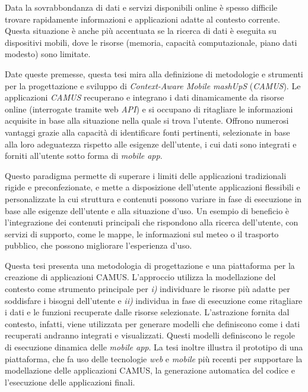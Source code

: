 Data la sovrabbondanza di dati e servizi disponibili online è spesso difficile trovare rapidamente informazioni e applicazioni adatte al contesto corrente. Questa situazione è anche più accentuata se la ricerca di dati è eseguita su dispositivi mobili, dove le risorse (memoria, capacità computazionale, piano dati modesto) sono limitate.

Date queste premesse, questa tesi mira alla definizione di metodologie e strumenti per la progettazione e sviluppo di \emph{Context-Aware Mobile mashUpS} (\emph{CAMUS}). Le applicazioni \emph{CAMUS} recuperano e integrano i dati dinamicamente da risorse online (interrogate tramite web \emph{API}) e si occupano di ritagliare le informazioni acquisite in base alla situazione nella quale si trova l'utente. Offrono numerosi vantaggi grazie alla capacità di identificare fonti pertinenti, selezionate in base alla loro adeguatezza rispetto alle esigenze dell'utente, i cui dati sono integrati e forniti all'utente sotto forma di \emph{mobile app}.

Questo paradigma permette di superare i limiti delle applicazioni tradizionali rigide e preconfezionate, e mette a disposizione dell'utente applicazioni flessibili e personalizzate la cui struttura e contenuti possono variare in fase di esecuzione in base alle esigenze dell'utente e alla situazione d'uso. Un esempio di beneficio è l'integrazione dei contenuti principali che rispondono alla ricerca dell'utente, con servizi di supporto, come le mappe, le informazioni sul meteo o il trasporto pubblico, che possono migliorare l'esperienza d'uso.

Questa tesi presenta una metodologia di progettazione e una piattaforma per la creazione di applicazioni CAMUS. L'approccio utilizza la modellazione del contesto come strumento principale per \emph{i)} individuare le risorse più adatte per soddisfare i bisogni dell'utente e \emph{ii)} individua in fase di esecuzione come ritagliare i dati e le funzioni recuperate dalle risorse selezionate. L'astrazione fornita dal contesto, infatti, viene utilizzata per generare modelli che definiscono come i dati recuperati andranno integrati e visualizzati. Questi modelli definiscono le regole di esecuzione dinamica delle \emph{mobile app}. La tesi inoltre illustra il prototipo di una piattaforma, che fa uso delle tecnologie \emph{web} e \emph{mobile} più recenti per supportare la modellazione delle applicazioni CAMUS, la generazione automatica del codice e l'esecuzione delle applicazioni finali.